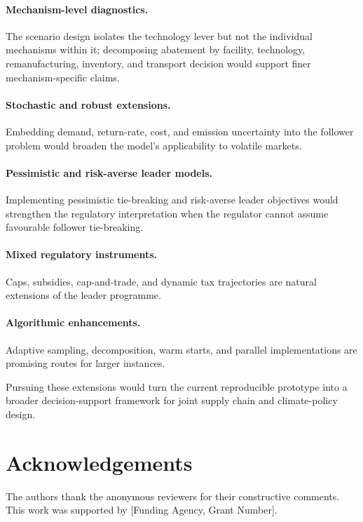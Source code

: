 \paragraph{Mechanism-level diagnostics.}
The scenario design isolates the technology lever but not the
individual mechanisms within it; decomposing abatement by facility,
technology, remanufacturing, inventory, and transport decision would
support finer mechanism-specific claims.

\paragraph{Stochastic and robust extensions.}
Embedding demand, return-rate, cost, and emission uncertainty into
the follower problem would broaden the model's applicability to
volatile markets.

\paragraph{Pessimistic and risk-averse leader models.}
Implementing pessimistic tie-breaking and risk-averse leader
objectives would strengthen the regulatory interpretation when the regulator
cannot assume favourable follower tie-breaking.

\paragraph{Mixed regulatory instruments.}
Caps, subsidies, cap-and-trade, and dynamic tax trajectories are
natural extensions of the leader programme.

\paragraph{Algorithmic enhancements.}
Adaptive sampling, decomposition, warm starts, and parallel \DBP
implementations are promising routes for larger instances.

Pursuing these extensions would turn the current reproducible
prototype into a broader decision-support framework for joint supply
chain and climate-policy design.

\section*{Acknowledgements}
The authors thank the anonymous reviewers for their constructive
comments. This work was supported by [Funding Agency, Grant Number].

